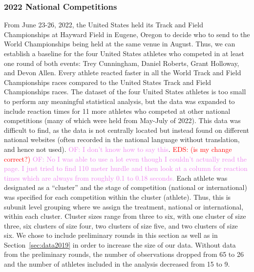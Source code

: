 \documentclass[12pt, letterpaper, titlepage]{article}
\newcommand{\eds}[1]{\textcolor{red}{EDS: (#1)}}
\newcommand{\of}[1]{\textcolor{violet}{OF: #1}}
\begin{document}
\subsubsection{2022 National Competitions}\label{sec:datanational}
From June 23-26, 2022, the United States held its Track and Field Championships 
at Hayward Field in Eugene, Oregon to decide who to send to the World 
Championships being held at the same venue in August. Thus, we can establish a 
baseline for the four United States athletes who competed in at least one round 
of both events: Trey Cunningham, Daniel Roberts, Grant Holloway, and Devon Allen.   
Every athlete reacted faster in all the World Track and Field Championships 
races compared to the United States Track and Field Championships races. The 
dataset of the four United States athletes is too small to perform any 
meaningful statistical analysis, but the data was expanded to include reaction 
times for 11 more athletes who competed at other national competitions (many of which were 
held from May-July of 2022). This data was difficult to find, as the data is not
centrally located but instead found on different national websites (often 
recorded in the national language without translation, and hence not used). 
\of{I don't know how to say this}. \eds{is my change correct?} \of{No I was able
to use a lot even though I couldn't actually read the page. I just tried to find
110 meter hurdle and then look at a column for reaction times which are always from
roughly 0.1 to 0.18 seconds.} Each athlete was 
designated as a ``cluster'' and the stage of competition (national or international) 
was specified for each competition within the cluster (athlete).
Thus, this is subunit level grouping where we assign the treatment, national or
international, within each cluster.  Cluster sizes range from three to six, with
one cluster of size three, six clusters of size four, two clusters of size five,
and two clusters of size six.  We chose to include preliminary rounds in this
section as well as in Section~\ref{sec:data2019} in order to increase the size 
of our data.  Without data from the preliminary rounds, the number of observations
dropped from 65 to 26 and the number of athletes included in the analysis
decreased from 15 to 9.

\end{document}
